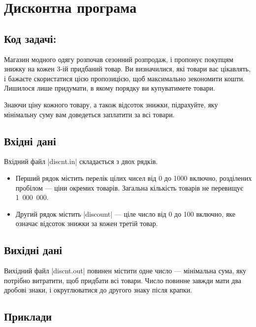 \documentclass[12pt,a4paper]{article}
\begin{document}
\section*{Дисконтна програма \hfill {}}


\subsection*{Код задачі: }

Магазин модного одягу розпочав сезонний розпродаж, і пропонує покупцям знижку на кожен 3-ій придбаний товар.
Ви визначилися, які товари вас цікавлять, і бажаєте скористатися цією пропозицією, щоб максимально зекономити кошти.
Лишилося лише придумати, в якому порядку ви купуватимете товари.

Знаючи ціну кожного товару, а також відсоток знижки, підрахуйте, яку мінімальну суму вам доведеться заплатити за всі товари.


\subsection*{Вхідні дані}

Вхідний файл |discnt.in| складається з двох рядків.

\begin{itemize}
    \item Перший рядок містить перелік цілих чисел від 0 до 1000 включно, розділених пробілом --- ціни окремих товарів. Загальна кількість товарів не перевищує 1~000~000.
    \item Другий рядок містить |discount| --- ціле число від 0 до 100 включно, яке означає відсоток знижки за кожен третій товар.
\end{itemize}


\subsection*{Вихідні дані}

Вихідний файл |discnt.out| повинен містити одне число --- мінімальна сума, яку потрібно витратити, щоб придбати всі товари. Число повинне завжди мати два дробові знаки, і округлюватися до другого знаку після крапки.


\pagebreak


\subsection*{Приклади}
\end{document}
